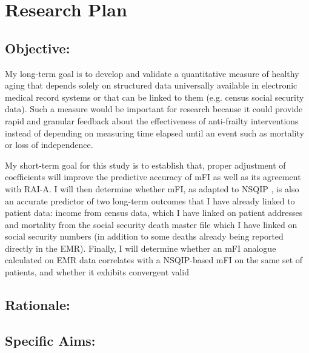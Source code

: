 \section{Research Plan }\label{research-plan}


\subsection{Objective:}\label{objective}
  
My long-term goal is to develop and validate a quantitative measure of healthy aging that depends solely on structured data universally available in electronic medical record systems or that can be linked to them (e.g. census social security data). Such a measure would be important for research because it could provide rapid and granular feedback about the effectiveness of anti-frailty interventions instead of depending on measuring time elapsed until an event such as mortality or loss of independence. 

My short-term goal for this study is to establish that, proper adjustment of coefficients will improve the predictive accuracy of mFI as well as its agreement with RAI-A. I will then determine whether mFI, as adapted to NSQIP \cite{Rockwood_2005}, is also an accurate predictor of two long-term outcomes that I have already linked to patient data: income from census data, which I have linked on patient addresses and mortality from the social security death master file which I have linked on social security numbers (in addition to some deaths already being reported directly in the EMR). Finally, I will determine whether an mFI analogue calculated on EMR data correlates with a NSQIP-based mFI on the same set of patients, and whether it exhibits convergent valid 

\subsection{Rationale:}\label{rationale}

\subsection{Specific Aims:}\label{specific-aims}
